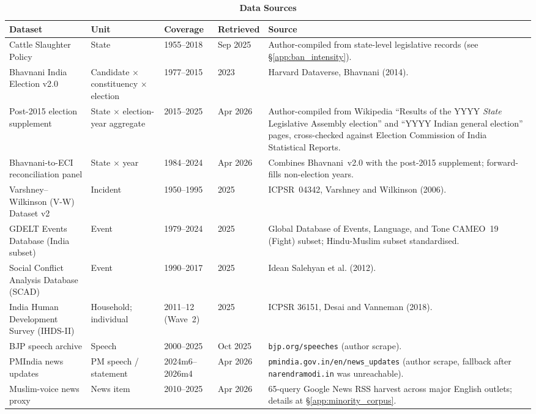 \documentclass[11pt,twoside]{extarticle}
\begin{document}
\begin{landscape}
\begin{table}[!htbp]
\centering
\caption{\bf Data Sources}
\label{Table:data_sources}\label{tab:data_sources}
\begin{threeparttable}
\singlespacing
\footnotesize
\setlength{\tabcolsep}{4pt}
\renewcommand{\arraystretch}{0.95}
\begin{tabularx}{\linewidth}{p{2.8cm}p{3.0cm}p{2.2cm}p{2.0cm}X}
\toprule[1.25pt]
Dataset & Unit & Coverage & Retrieved & Source \\
\midrule
Cattle Slaughter Policy & State & 1955--2018 & Sep 2025 & Author-compiled from state-level legislative records (see \S\ref{app:ban_intensity}). \\
Bhavnani India Election v2.0 & Candidate $\times$ constituency $\times$ election & 1977--2015 & 2023 & Harvard Dataverse, Bhavnani (2014). \\
Post-2015 election supplement & State $\times$ election-year aggregate & 2015--2025 & Apr 2026 & Author-compiled from Wikipedia ``Results of the YYYY \textit{State} Legislative Assembly election'' and ``YYYY Indian general election'' pages, cross-checked against Election Commission of India Statistical Reports. \\
Bhavnani-to-ECI reconciliation panel & State $\times$ year & 1984--2024 & Apr 2026 & Combines Bhavnani~v2.0 with the post-2015 supplement; forward-fills non-election years. \\
Varshney--Wilkinson (V-W) Dataset v2 & Incident & 1950--1995 & 2025 & ICPSR~04342, Varshney and Wilkinson (2006). \\
GDELT Events Database (India subset) & Event & 1979--2024 & 2025 & Global Database of Events, Language, and Tone CAMEO~19 (Fight) subset; Hindu-Muslim subset standardised. \\
Social Conflict Analysis Database (SCAD) & Event & 1990--2017 & 2025 & Idean Salehyan et al. (2012). \\
India Human Development Survey (IHDS-II) & Household; individual & 2011--12 (Wave~2) & 2025 & ICPSR 36151, Desai and Vanneman (2018). \\
BJP speech archive & Speech & 2000--2025 & Oct 2025 & \texttt{bjp.org/speeches} (author scrape). \\
PMIndia news updates & PM speech / statement & 2024m6--2026m4 & Apr 2026 & \texttt{pmindia.gov.in/en/news\_updates} (author scrape, fallback after \texttt{narendramodi.in} was unreachable). \\
Muslim-voice news proxy & News item & 2010--2025 & Apr 2026 & 65-query Google News RSS harvest across major English outlets; details at \S\ref{app:minority_corpus}. \\

\end{tabularx}
\end{threeparttable}
\end{table}
\end{landscape}
\end{document}

